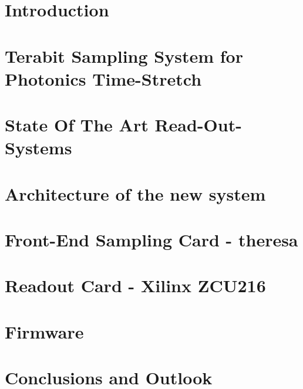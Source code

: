 \documentclass[dvipsnames,table]{include/thesisclass} %
\begin{document}
    \FrontMatter
    
	\tikzexternaldisable
    
    \tikzexternalenable
    
       
	
    \begingroup      %
    \tableofcontents %
    \listoffigures
    \listoftables
    \printglossary
    \endgroup
    \cleardoublepage

    \MainMatter
    \chapter{Introduction}
    		
    \chapter{Terabit Sampling System for Photonics Time-Stretch}
    		
   	\chapter{State Of The Art Read-Out-Systems}
   			
   	\chapter{Architecture of the new system}
   			
   	\chapter{Front-End Sampling Card - \gls{theresa}}
   				
   	\chapter{Readout Card - Xilinx ZCU216}
   			
   	\chapter{Firmware}
   						
    \chapter{Conclusions and Outlook}
   				
\end{document}
